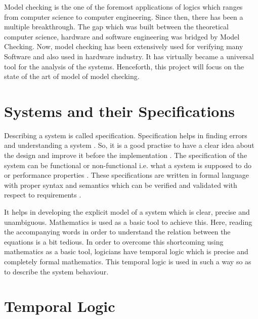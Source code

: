 \documentclass[a4paper,12pt]{report}
\begin{document}
Model checking is the one of the foremost applications of logics which ranges from computer science to computer engineering. Since then, there has been a multiple breakthrough. The gap which was built between the theoretical computer science, hardware and software engineering was bridged by Model Checking. Now, model checking has been extensively used for verifying many Software and also used in hardware industry\cite{Jackson2000}. It has virtually became a universal tool for the analysis of the systems. Henceforth, this project will focus on the state of the art of model of model checking.

\section{Systems and their Specifications}
\label{Sys and Spec}

Describing a system is called specification. Specification helps in finding errors and understanding a system \cite{Wang2007}. So, it is a good practise to have a clear idea about the design and improve it before the implementation \cite{ErichGamma1995}. The specification of the system can be functional or non-functional i.e. what a system is supposed to do or performance properties \cite{Wang2007}. These specifications are written in formal language with proper syntax and semantics which can be verified and validated with respect to requirements \cite{J.M.Wing1996}.

It helps in developing the explicit model of a system which is clear, precise and unambiguous. Mathematics is used as a basic tool to achieve this. Here, reading the accompanying words in order to understand the relation between the equations is a bit tedious. In order to overcome this shortcoming using mathematics as a basic tool, logicians have temporal logic which is precise and completely formal mathematics. This temporal logic is used in such a way so as to describe the system behaviour. 

\section{Temporal Logic} 
\label{Temp Logic}
\end{document}
